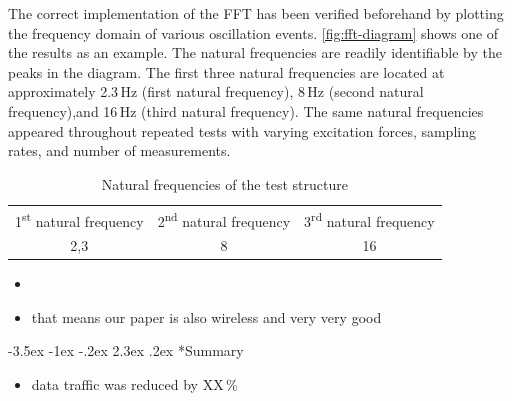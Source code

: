 \documentclass[12pt,a4paper]{scrartcl}
\makeatletter
\renewcommand\section{\@startsection{section}{1}{\z@}%
                     {-3.5ex \@plus -1ex \@minus -.2ex}%
                     {2.3ex \@plus.2ex}%
                     {\normalfont\large\bfseries}}
\makeatother
\begin{document}
The correct implementation of the FFT has been verified beforehand by plotting the frequency domain of various oscillation events.
\autoref{fig:fft-diagram} shows  one of the results as an example.
The natural frequencies are readily identifiable by the peaks in the diagram.
The first three natural frequencies are located at approximately 2.3\,Hz (first natural frequency), 8\,Hz (second natural frequency),and 16\,Hz (third natural frequency).
The same natural frequencies appeared throughout repeated tests with varying excitation forces, sampling rates, and number of measurements.

\begin{table}[ht]
	\centering
	\begin{tabular}{c c c}
		1\textsuperscript{st} natural frequency & 2\textsuperscript{nd} natural frequency & 3\textsuperscript{rd} natural frequency \\ 
		2,3 & 8 & 16 \\
	\end{tabular}
	\caption{Natural frequencies of the test structure}
	\label{tab:nat-freqs}
\end{table}

\begin{itemize}
	\item 
	\item that means our paper is also wireless and very very good
\end{itemize}


\section*{Summary}

\begin{itemize}
	\item data traffic was reduced by XX\,\% 
\end{itemize}




\end{document}
